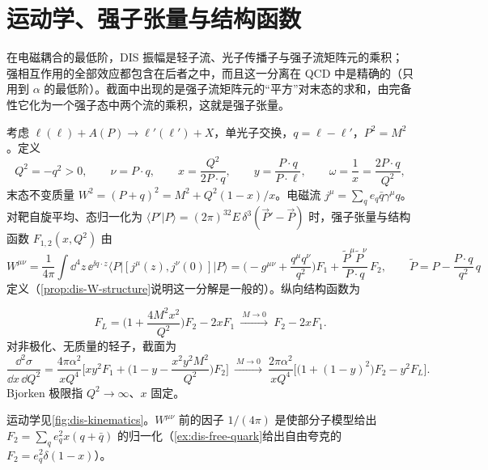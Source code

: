 \section{运动学、强子张量与结构函数}\label{sec:dis-kinematics}

在电磁耦合的最低阶，DIS 振幅是轻子流、光子传播子与强子流矩阵元的乘积；强相互作用的全部效应都包含在后者之中，而且这一分离在 QCD 中是精确的（只用到 $\alpha$ 的最低阶）。截面中出现的是强子流矩阵元的“平方”对末态的求和，由完备性它化为一个强子态中两个流的乘积，这就是强子张量。

\begin{definition}\label{def:dis-kinematics}
考虑 $\ell(\ell)+A(P)\to\ell'(\ell')+X$，单光子交换，$q=\ell-\ell'$，$P^2=M^2$。定义
\begin{equation}\label{eq:dis-invariants}
Q^2=-q^2>0,\qquad \nu=P\cdot q,\qquad x=\frac{Q^2}{2P\cdot q},\qquad y=\frac{P\cdot q}{P\cdot\ell},\qquad \omega=\frac1x=\frac{2P\cdot q}{Q^2},
\end{equation}
末态不变质量 $W^2=(P+q)^2=M^2+Q^2(1-x)/x$。电磁流 $j^\mu=\sum_qe_q\bar q\gamma^\mu q$。对靶自旋平均、态归一化为 $\langle P'|P\rangle=(2\pi)^32E\,\delta^3(\vec P'-\vec P)$ 时，强子张量与结构函数 $F_{1,2}(x,Q^2)$ 由
\begin{equation}\label{eq:dis-W}
W^{\mu\nu}=\frac1{4\pi}\int\dd^4z\,\ee^{\ii q\cdot z}\langle P|[j^\mu(z),j^\nu(0)]|P\rangle
=\Big(-g^{\mu\nu}+\frac{q^\mu q^\nu}{q^2}\Big)F_1+\frac{\tilde P^\mu\tilde P^\nu}{P\cdot q}\,F_2,\qquad \tilde P=P-\frac{P\cdot q}{q^2}\,q
\end{equation}
定义（\cref{prop:dis-W-structure}说明这一分解是一般的）。纵向结构函数为%

\begin{equation}\label{eq:dis-FL}
F_L=\Big(1+\frac{4M^2x^2}{Q^2}\Big)F_2-2xF_1\ \xrightarrow{\ M\to0\ }\ F_2-2xF_1 .
\end{equation}
对非极化、无质量的轻子，截面为
\begin{equation}\label{eq:dis-xsec}
\frac{\dd^2\sigma}{\dd x\,\dd Q^2}=\frac{4\pi\alpha^2}{xQ^4}\Big[xy^2F_1+\Big(1-y-\frac{x^2y^2M^2}{Q^2}\Big)F_2\Big]
\ \xrightarrow{\ M\to0\ }\ \frac{2\pi\alpha^2}{xQ^4}\Big[\big(1+(1-y)^2\big)F_2-y^2F_L\Big].
\end{equation}
Bjorken 极限指 $Q^2\to\infty$、$x$ 固定。
\end{definition}

运动学见\cref{fig:dis-kinematics}。$W^{\mu\nu}$ 前的因子 $1/(4\pi)$ 是使部分子模型给出 $F_2=\sum_qe_q^2x(q+\bar q)$ 的归一化（\cref{ex:dis-free-quark}给出自由夸克的 $F_2=e_q^2\delta(1-x)$）。

